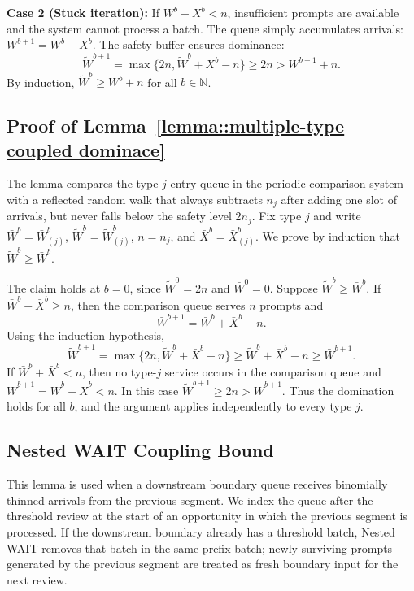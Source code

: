 \textbf{Case 2 (Stuck iteration):} If \(W^b+X^b<n\), insufficient prompts are available and the system cannot process a batch. The queue simply accumulates arrivals: \(W^{b+1}=W^b+X^b\). The safety buffer ensures dominance:
$$\tilde{W}^{b+1}=\max\{ 2n, \tilde{W}^b + X^b - n \}\geq 2n>W^{b+1}+n.$$
By induction, \(\tilde{W}^b \geq W^b+n\) for all \(b \in \mathbb{N}\).

\subsection{Proof of Lemma~\ref{lemma::multiple-type coupled dominace}}\label{appendix_lemma::proof of multiple-type coupled dominace}
The lemma compares the type-\(j\) entry queue in the periodic comparison system with a reflected random walk that always subtracts \(n_j\) after adding one slot of arrivals, but never falls below the safety level \(2n_j\). Fix type \(j\) and write \(\bar W^b=\bar W^b_{(j)}\), \(\widetilde W^b=\widetilde W^b_{(j)}\), \(n=n_j\), and \(\bar X^b=\bar X^b_{(j)}\). We prove by induction that \(\widetilde W^b\ge \bar W^b\).

The claim holds at \(b=0\), since \(\widetilde W^0=2n\) and \(\bar W^0=0\). Suppose \(\widetilde W^b\ge \bar W^b\). If \(\bar W^b+\bar X^b\ge n\), then the comparison queue serves \(n\) prompts and
\[
    \bar W^{b+1}=\bar W^b+\bar X^b-n.
\]
Using the induction hypothesis,
\[
    \widetilde W^{b+1}
    =\max\{2n,\widetilde W^b+\bar X^b-n\}
    \ge \widetilde W^b+\bar X^b-n
    \ge \bar W^{b+1}.
\]
If \(\bar W^b+\bar X^b<n\), then no type-\(j\) service occurs in the comparison queue and \(\bar W^{b+1}=\bar W^b+\bar X^b<n\). In this case \(\widetilde W^{b+1}\ge2n>\bar W^{b+1}\). Thus the domination holds for all \(b\), and the argument applies independently to every type \(j\).

\subsection{Nested WAIT Coupling Bound}\label{appendix_lemma::proof of nested coupled process}
This lemma is used when a downstream boundary queue receives binomially thinned arrivals from the previous segment. We index the queue after the threshold review at the start of an opportunity in which the previous segment is processed. If the downstream boundary already has a threshold batch, Nested WAIT removes that batch in the same prefix batch; newly surviving prompts generated by the previous segment are treated as fresh boundary input for the next review.

